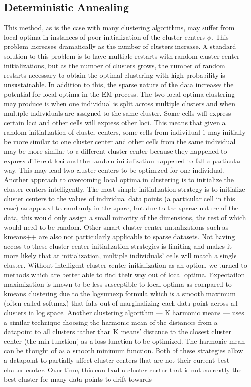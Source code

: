 \subsection{Deterministic Annealing} 
\par{
This method, as is the case with many clustering algorithms, may suffer from local optima in instances of poor initialization of the cluster centers $\phi$. This problem increases dramatically as the number of clusters increase. A standard solution to this problem is to have multiple restarts with random cluster center initializations, but as the number of clusters grows, the number of random restarts necessary to obtain the optimal clustering with high probability is unsustainable\cite{kmeansiterations}\cite{kmeansslow}. In addition to this, the sparse nature of the data increases the potential for local optima in the EM process. The two local optima clustering may produce is when one individual is split across multiple clusters and when multiple individuals are assigned to the same cluster. Some cells will express certain loci and other cells will express other loci. This means that given a random initialization of cluster centers, some cells from individual 1 may initially be more similar to one cluster center and other cells from the same individual may be more similar to a different cluster center because they happened to express different loci and the random initialization happened to fall a particular way. This may lead two cluster centers to be optimized for one individual. Another approach to overcoming local optima in clustering is to initialize the cluster centers intelligently. The most simple initialization strategy is to initialize cluster centers to the values of individual data points (a particular cell in this case) as opposed to randomly in the space, but due to the sparse nature of the data, this would only assign a small minority of the dimensions, the rest of which would need to be random. Other smart cluster center initializations such as kmeans++ are also not particularly applicable to sparse datasets\cite{kmeanspp}. Not having access to these cluster center initialization strategies is limiting and makes it more likely that at initialization, multiple individuals' cells will match a single cluster. Without intelligent cluster center initialization as an option, we turned to methods which are better able to find their way out of local optima. Expectation maximization is known to be less susceptible to local optima as compared to kmeans clustering due to the logsumexp formula which is a smooth maximum (often called softmax) that falls out of marginalizing each data point across all clusters in log space\cite{KHM}. Another clustering algorithm --- K harmonic means --- uses a similar technique choosing the harmonic mean of the distances from a datapoint to all clusters rather than K means' distance to the closest cluster center (the min function) as a loss function to be optimized. The harmonic mean can be thought of as a smooth minimum function. Both of these strategies allow a datapoint to partially affect cluster centers that are not their current best cluster center. Over time, this can lead a cluster center that is not currently the best cluster for many data points to drift towards }
